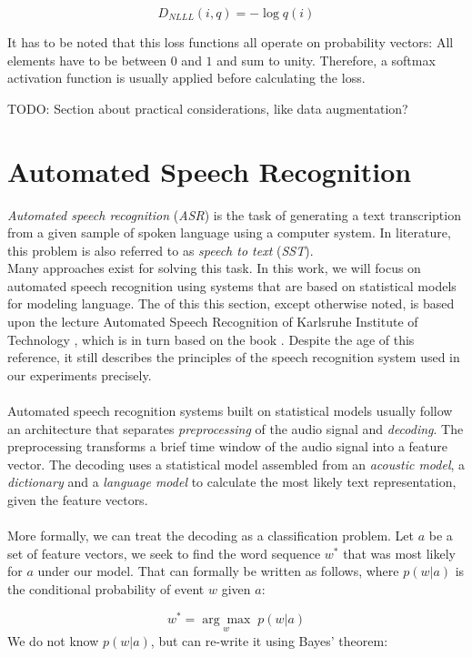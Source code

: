 \[
D_{NLLL}(i, q) = -\log q(i)
\]

It has to be noted that this loss functions all operate on probability vectors: All elements have to be between $0$ and $1$ and sum to unity. Therefore, a softmax activation function is usually applied before calculating the loss. 

TODO: Section about practical considerations, like data augmentation? 

\section{Automated Speech Recognition}
\label{ch:HMM_ASR}
\textit{Automated speech recognition} (\textit{ASR}) is the task of generating a text transcription from a given sample of spoken language using a computer system. In literature, this problem is also referred to as \textit{speech to text} (\textit{SST}). \\
Many approaches exist for solving this task. In this work, we will focus on automated speech recognition using systems that are based on statistical models for modeling language. The of this this section, except otherwise noted, is based upon the lecture Automated Speech Recognition of Karlsruhe Institute of Technology \cite{kitasr2018stueker}, which is in turn based on the book \cite{schukat1995automatische}. Despite the age of this reference, it still describes the principles of the speech recognition system used in our experiments precisely. \\ \\
Automated speech recognition systems built on statistical models usually follow an architecture that separates \textit{preprocessing} of the audio signal and \textit{decoding}. The preprocessing transforms a brief time window of the audio signal into a feature vector. The decoding uses a statistical model assembled from an \textit{acoustic model}, a \textit{dictionary} and a \textit{language model} to calculate the most likely text representation, given the feature vectors.\\ \\

More formally, we can treat the decoding as a classification problem. Let $a$ be a set of feature vectors, we seek to find the word sequence $w^*$ that was most likely for $a$ under our model. That can formally be written as follows, where $p(w|a)$ is the conditional probability of event $w$ given $a$:

\[
w^* = \underset{w}{\arg \max} \; p(w|a)
\] 
We do not know $p(w|a)$, but can re-write it using Bayes' theorem:

